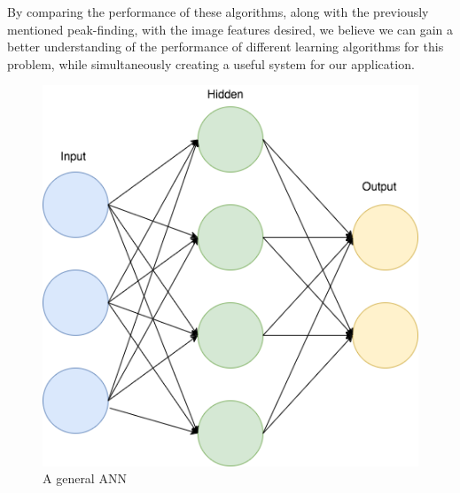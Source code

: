 By comparing the performance of these algorithms, along with the previously mentioned peak-finding, with the image features desired, we believe we can gain a better understanding of the performance of different learning algorithms for this problem, while simultaneously creating a useful system for our application.

\begin{figure}[h]
\centering
\includegraphics[scale=.50]{figures/NN}
\caption{A general ANN}
\label{fig:tamu-fig3}
\end{figure}



